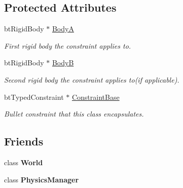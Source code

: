 \subsection*{Protected Attributes}
\begin{DoxyCompactItemize}
\item 
\hypertarget{classphys_1_1TypedConstraint_a5e4251df846e7afbab2e49039530a140}{
btRigidBody $\ast$ \hyperlink{classphys_1_1TypedConstraint_a5e4251df846e7afbab2e49039530a140}{BodyA}}
\label{d1/d17/classphys_1_1TypedConstraint_a5e4251df846e7afbab2e49039530a140}

\begin{DoxyCompactList}\small\item\em First rigid body the constraint applies to. \item\end{DoxyCompactList}\item 
\hypertarget{classphys_1_1TypedConstraint_ab90a86274d18f45628e91a76d28c8278}{
btRigidBody $\ast$ \hyperlink{classphys_1_1TypedConstraint_ab90a86274d18f45628e91a76d28c8278}{BodyB}}
\label{d1/d17/classphys_1_1TypedConstraint_ab90a86274d18f45628e91a76d28c8278}

\begin{DoxyCompactList}\small\item\em Second rigid body the constraint applies to(if applicable). \item\end{DoxyCompactList}\item 
\hypertarget{classphys_1_1TypedConstraint_a31527f4782a0861fd6fd4bb7e201b23f}{
btTypedConstraint $\ast$ \hyperlink{classphys_1_1TypedConstraint_a31527f4782a0861fd6fd4bb7e201b23f}{ConstraintBase}}
\label{d1/d17/classphys_1_1TypedConstraint_a31527f4782a0861fd6fd4bb7e201b23f}

\begin{DoxyCompactList}\small\item\em Bullet constraint that this class encapsulates. \item\end{DoxyCompactList}\end{DoxyCompactItemize}
\subsection*{Friends}
\begin{DoxyCompactItemize}
\item 
\hypertarget{classphys_1_1TypedConstraint_a7b4bcdf992c21ae83363f25df05b1d25}{
class {\bfseries World}}
\label{d1/d17/classphys_1_1TypedConstraint_a7b4bcdf992c21ae83363f25df05b1d25}

\item 
\hypertarget{classphys_1_1TypedConstraint_a139cf05ac01161b7071c8a037c841683}{
class {\bfseries PhysicsManager}}
\label{d1/d17/classphys_1_1TypedConstraint_a139cf05ac01161b7071c8a037c841683}

\end{DoxyCompactItemize}


